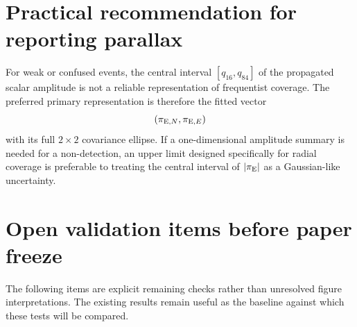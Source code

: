 \documentclass[11pt,a4paper]{article}
\newcommand{\pen}{\pi_{{\rm E},N}}
\newcommand{\pee}{\pi_{{\rm E},E}}
\begin{document}
\section{Practical recommendation for reporting parallax}

For weak or confused events, the central interval $[q_{16},q_{84}]$ of the propagated scalar
amplitude is not a reliable representation of frequentist coverage.  The preferred primary
representation is therefore the fitted vector
\begin{equation}
    (\pen,\pee)
\end{equation}
with its full $2\times2$ covariance ellipse.  If a one-dimensional amplitude summary is needed
for a non-detection, an upper limit designed specifically for radial coverage is preferable to
treating the central interval of $|\pi_{\rm E}|$ as a Gaussian-like uncertainty.

\section{Open validation items before paper freeze}
\label{sec:open_checks}

The following items are explicit remaining checks rather than unresolved figure
interpretations.  The existing results remain useful as the baseline against which these tests
will be compared.
\end{document}
